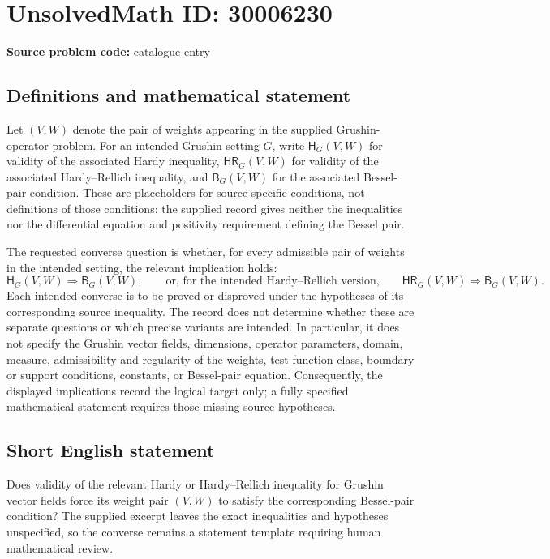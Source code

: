 \documentclass[11pt]{article}
\begin{document}
\section*{UnsolvedMath ID: 30006230}
\textbf{Source problem code:} catalogue entry
\subsection{Definitions and mathematical statement}
Let \((V,W)\) denote the pair of weights appearing in the supplied Grushin-operator problem. For an intended Grushin setting \(G\), write \(\mathsf{H}_{G}(V,W)\) for validity of the associated Hardy inequality, \(\mathsf{HR}_{G}(V,W)\) for validity of the associated Hardy--Rellich inequality, and \(\mathsf{B}_{G}(V,W)\) for the associated Bessel-pair condition. These are placeholders for source-specific conditions, not definitions of those conditions: the supplied record gives neither the inequalities nor the differential equation and positivity requirement defining the Bessel pair.

The requested converse question is whether, for every admissible pair of weights in the intended setting, the relevant implication holds:
\[
\mathsf{H}_{G}(V,W)\Longrightarrow\mathsf{B}_{G}(V,W),
\qquad\text{or, for the intended Hardy--Rellich version,}\qquad
\mathsf{HR}_{G}(V,W)\Longrightarrow\mathsf{B}_{G}(V,W).
\]
Each intended converse is to be proved or disproved under the hypotheses of its corresponding source inequality. The record does not determine whether these are separate questions or which precise variants are intended. In particular, it does not specify the Grushin vector fields, dimensions, operator parameters, domain, measure, admissibility and regularity of the weights, test-function class, boundary or support conditions, constants, or Bessel-pair equation. Consequently, the displayed implications record the logical target only; a fully specified mathematical statement requires those missing source hypotheses.
\subsection{Short English statement}
Does validity of the relevant Hardy or Hardy--Rellich inequality for Grushin vector fields force its weight pair \((V,W)\) to satisfy the corresponding Bessel-pair condition? The supplied excerpt leaves the exact inequalities and hypotheses unspecified, so the converse remains a statement template requiring human mathematical review.
\end{document}
